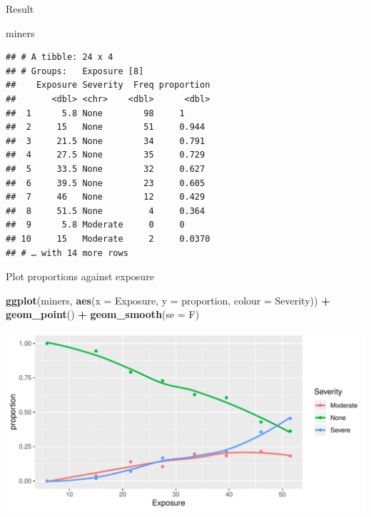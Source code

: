 \documentclass[ignorenonframetext,]{beamer}
\newenvironment{Shaded}{\begin{snugshade}}{\end{snugshade}}
\newcommand{\DataTypeTok}[1]{\textcolor[rgb]{0.13,0.29,0.53}{#1}}
\newcommand{\KeywordTok}[1]{\textcolor[rgb]{0.13,0.29,0.53}{\textbf{#1}}}
\newcommand{\NormalTok}[1]{#1}
\newcommand{\OperatorTok}[1]{\textcolor[rgb]{0.81,0.36,0.00}{\textbf{#1}}}
\newcommand{\StringTok}[1]{\textcolor[rgb]{0.31,0.60,0.02}{#1}}
\begin{document}
\begin{frame}[fragile]{Result}
\protect\hypertarget{result}{}

\small

\begin{Shaded}
\begin{Highlighting}[]
\NormalTok{miners}
\end{Highlighting}
\end{Shaded}

\begin{verbatim}
## # A tibble: 24 x 4
## # Groups:   Exposure [8]
##    Exposure Severity  Freq proportion
##       <dbl> <chr>    <dbl>      <dbl>
##  1      5.8 None        98     1     
##  2     15   None        51     0.944 
##  3     21.5 None        34     0.791 
##  4     27.5 None        35     0.729 
##  5     33.5 None        32     0.627 
##  6     39.5 None        23     0.605 
##  7     46   None        12     0.429 
##  8     51.5 None         4     0.364 
##  9      5.8 Moderate     0     0     
## 10     15   Moderate     2     0.0370
## # … with 14 more rows
\end{verbatim}

\normalsize

\end{frame}

\begin{frame}[fragile]{Plot proportions against exposure}
\protect\hypertarget{plot-proportions-against-exposure}{}

\small

\begin{Shaded}
\begin{Highlighting}[]
\KeywordTok{ggplot}\NormalTok{(miners, }\KeywordTok{aes}\NormalTok{(}\DataTypeTok{x =}\NormalTok{ Exposure, }\DataTypeTok{y =}\NormalTok{ proportion,}
                   \DataTypeTok{colour =}\NormalTok{ Severity)) }\OperatorTok{+}\StringTok{ }
\StringTok{  }\KeywordTok{geom_point}\NormalTok{() }\OperatorTok{+}\StringTok{ }\KeywordTok{geom_smooth}\NormalTok{(}\DataTypeTok{se =}\NormalTok{ F)}
\end{Highlighting}
\end{Shaded}

\includegraphics{figure/unnamed-chunk-109-1.pdf} \normalsize

\end{frame}
\end{document}
